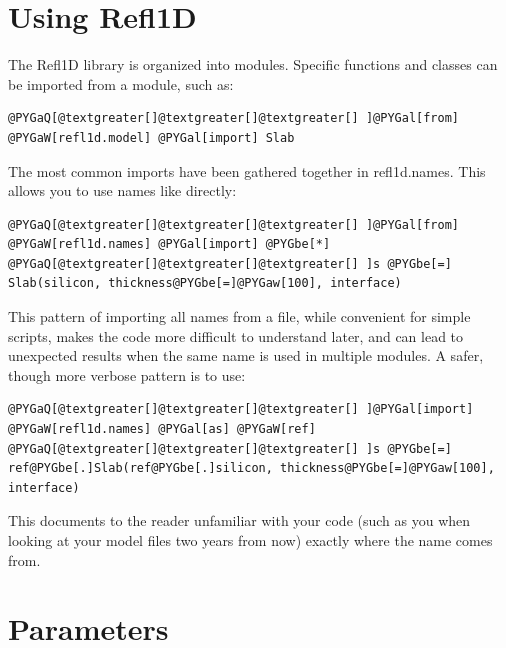 \documentclass[letterpaper,10pt,english]{sphinxmanual}
\begin{document}
\section{Using Refl1D}
\label{guide/intro:intro-guide}\label{guide/intro:using-refl1d}\label{guide/intro::doc}
The Refl1D library is organized into modules.  Specific functions and
classes can be imported from a module, such as:

\begin{Verbatim}[commandchars=@\[\]]
@PYGaQ[@textgreater[]@textgreater[]@textgreater[] ]@PYGal[from] @PYGaW[refl1d.model] @PYGal[import] Slab
\end{Verbatim}

The most common imports have been gathered together in refl1d.names.  This
allows you to use names like {\hyperref[api/model:refl1d.model.Slab]{}} directly:

\begin{Verbatim}[commandchars=@\[\]]
@PYGaQ[@textgreater[]@textgreater[]@textgreater[] ]@PYGal[from] @PYGaW[refl1d.names] @PYGal[import] @PYGbe[*]
@PYGaQ[@textgreater[]@textgreater[]@textgreater[] ]s @PYGbe[=] Slab(silicon, thickness@PYGbe[=]@PYGaw[100], interface)
\end{Verbatim}

This pattern of importing all names from a file,  while convenient for
simple scripts, makes the code more difficult to understand later, and
can lead to unexpected results when the same name is used in multiple
modules.  A safer, though more verbose pattern is to use:

\begin{Verbatim}[commandchars=@\[\]]
@PYGaQ[@textgreater[]@textgreater[]@textgreater[] ]@PYGal[import] @PYGaW[refl1d.names] @PYGal[as] @PYGaW[ref]
@PYGaQ[@textgreater[]@textgreater[]@textgreater[] ]s @PYGbe[=] ref@PYGbe[.]Slab(ref@PYGbe[.]silicon, thickness@PYGbe[=]@PYGaw[100], interface)
\end{Verbatim}

This documents to the reader unfamiliar with your code (such as you when
looking at your model files two years from now) exactly where the
name comes from.


\section{Parameters}
\label{guide/parameter::doc}\label{guide/parameter:parameter-guide}\label{guide/parameter:parameters}
\end{document}
